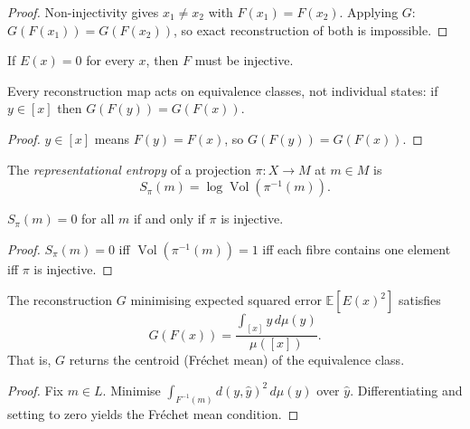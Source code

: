 \begin{proof}
  Non-injectivity gives $x_1 \neq x_2$ with $F(x_1) = F(x_2)$.
  Applying $G$: $G(F(x_1)) = G(F(x_2))$, so exact
  reconstruction of both is impossible.
\end{proof}

\begin{corollary}
  If $E(x) = 0$ for every $x$, then $F$ must be injective.
\end{corollary}

\begin{proposition}
  Every reconstruction map acts on equivalence classes,
  not individual states:
  if $y \in [x]$ then $G(F(y)) = G(F(x))$.
\end{proposition}

\begin{proof}
  $y \in [x]$ means $F(y) = F(x)$, so $G(F(y)) = G(F(x))$.
\end{proof}

\begin{definition}
  The \emph{representational entropy} of a projection
  $\pi : X \to M$ at $m \in M$ is
  \[
    S_\pi(m) = \log \operatorname{Vol}(\pi^{-1}(m)).
  \]
\end{definition}

\begin{proposition}
  \label{prop:entropy-inject}
  $S_\pi(m) = 0$ for all $m$ if and only if $\pi$ is injective.
\end{proposition}

\begin{proof}
  $S_\pi(m) = 0$ iff $\operatorname{Vol}(\pi^{-1}(m)) = 1$
  iff each fibre contains one element iff $\pi$ is injective.
\end{proof}

\begin{theorem}
  \label{thm:min-recon}
  The reconstruction $G$ minimising expected squared error
  $\mathbb{E}[E(x)^2]$ satisfies
  \[
    G(F(x)) = \frac{\int_{[x]} y\, d\mu(y)}{\mu([x])}.
  \]
  That is, $G$ returns the centroid (Fréchet mean) of the
  equivalence class.
\end{theorem}

\begin{proof}
  Fix $m \in L$.
  Minimise $\int_{F^{-1}(m)} d(y, \hat{y})^2\, d\mu(y)$
  over $\hat{y}$.
  Differentiating and setting to zero yields the Fréchet mean
  condition.
\end{proof}

